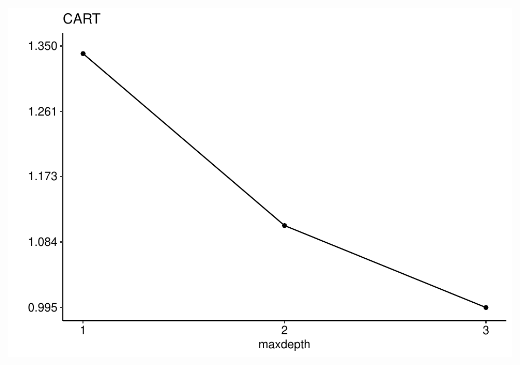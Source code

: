 \documentclass[
]{article}
\begin{document}
\includegraphics{sl-inf-cairs-2301_files/figure-latex/optResults-9.pdf}
\end{document}
